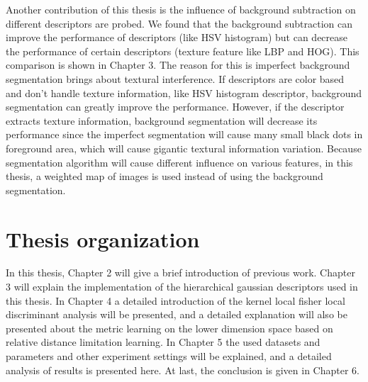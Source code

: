 Another contribution of this thesis is the influence of background subtraction on different descriptors are probed. We found that the background subtraction can improve the performance of descriptors (like HSV histogram) but can decrease the performance of  certain descriptors (texture feature like LBP and HOG). This comparison is shown in Chapter 3. The reason for this is imperfect background segmentation brings about textural interference. If descriptors are color based and don't handle texture information, like HSV histogram descriptor, background segmentation can greatly improve the performance. However, if the descriptor extracts texture information, background segmentation will decrease its performance since the imperfect segmentation will cause many small black dots in foreground area, which will cause gigantic textural information variation. Because segmentation algorithm will cause different influence on various features, in this thesis, a weighted map of images is used instead of using the background segmentation.

\section{Thesis organization}
In this thesis, Chapter 2 will give a brief introduction of previous work. Chapter 3 will explain the implementation of the hierarchical gaussian descriptors used in this thesis. In Chapter 4 a detailed introduction of the kernel local fisher local discriminant analysis will be presented, and a detailed explanation will also be presented about the metric learning on the lower dimension space based on relative distance limitation learning.
In Chapter 5 the used datasets and parameters and other experiment settings will be explained, and a detailed analysis of results is presented here. At last, the conclusion is given in Chapter 6.




